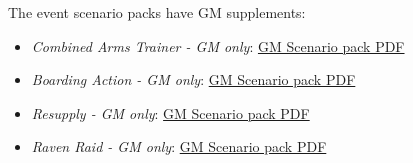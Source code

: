 {\begin{itemize}
\end{itemize}

The event scenario packs have GM supplements:

\begin{itemize}

\item \emph{Combined Arms Trainer - GM only}: \href{https://raw.githubusercontent.com/Eudicods/outworlds-wastes/rules-pdf/combined-arms-trainer-gm-only.pdf}{GM Scenario pack PDF}

\item \emph{Boarding Action - GM only}: \href{https://raw.githubusercontent.com/Eudicods/outworlds-wastes/rules-pdf/boarding-action-gm-only.pdf}{GM Scenario pack PDF}

\item \emph{Resupply - GM only}: \href{https://raw.githubusercontent.com/Eudicods/outworlds-wastes/rules-pdf/resupply-gm-only.pdf}{GM Scenario pack PDF}

\item \emph{Raven Raid - GM only}: \href{https://raw.githubusercontent.com/Eudicods/outworlds-wastes/rules-pdf/raven-raid-gm-only.pdf}{GM Scenario pack PDF}

\end{itemize}

}{}
